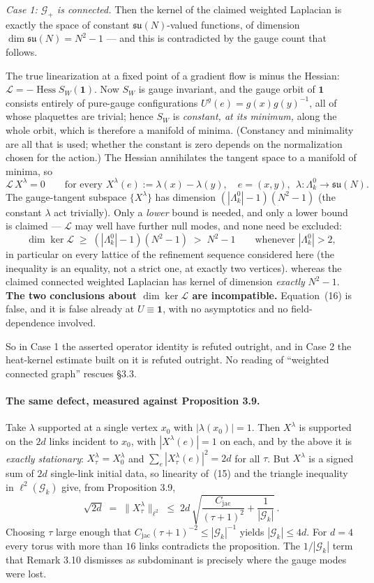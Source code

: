 \documentclass[11pt]{article}
\newcommand{\su}{\mathfrak{su}}
\begin{document}
\emph{Case 1: $\mathcal G_+$ is connected.} Then the kernel of the claimed weighted
Laplacian is exactly the space of constant $\su(N)$-valued functions, of dimension
$\dim\su(N)=N^2-1$ --- and this is contradicted by the gauge count that follows.

The true linearization at a fixed point of a gradient flow is minus the Hessian:
$\mathcal L=-\operatorname{Hess}S_W(\mathbf 1)$. Now $S_W$ is gauge invariant, and the
gauge orbit of $\mathbf 1$ consists entirely of pure-gauge configurations
$U^g(e)=g(x)g(y)^{-1}$, all of whose plaquettes are trivial; hence $S_W$ is
\emph{constant, at its minimum,} along the whole orbit, which is therefore a manifold
of minima. (Constancy and minimality are all that is used; whether the constant is
zero depends on the normalization chosen for the action.) The Hessian annihilates the
tangent space to a manifold of minima, so
\[
\mathcal L\,X^\lambda=0
\qquad\text{for every }
X^\lambda(e):=\lambda(x)-\lambda(y),\quad e=(x,y),\ \ \lambda:\Lambda^0_k\to\su(N).
\]
The gauge-tangent subspace $\{X^\lambda\}$ has dimension $(|\Lambda^0_k|-1)(N^2-1)$
(the constant $\lambda$ act trivially). Only a \emph{lower} bound is needed, and only
a lower bound is claimed --- $\mathcal L$ may well have further null modes, and none
need be excluded:
\[
\dim\ker\mathcal L\;\ge\;(|\Lambda^0_k|-1)(N^2-1)\;>\;N^2-1
\qquad\text{whenever }|\Lambda^0_k|>2,
\]
in particular on every lattice of the refinement sequence considered here (the
inequality is an equality, not a strict one, at exactly two vertices).
whereas the claimed connected weighted Laplacian has kernel of dimension
\emph{exactly} $N^2-1$. \textbf{The two conclusions about $\dim\ker\mathcal L$ are
incompatible.} Equation~(16) is false, and it is false already at $U\equiv\mathbf 1$,
with no asymptotics and no field-dependence involved.

So in Case 1 the asserted operator identity is refuted outright, and in Case 2 the
heat-kernel estimate built on it is refuted outright. No reading of ``weighted
connected graph'' rescues \S3.3.

\paragraph{The same defect, measured against Proposition 3.9.}
Take $\lambda$ supported at a single vertex $x_0$ with $|\lambda(x_0)|=1$. Then $X^\lambda$
is supported on the $2d$ links incident to $x_0$, with $|X^\lambda(e)|=1$ on each, and by
the above it is \emph{exactly stationary}: $X^\lambda_\tau=X^\lambda_0$ and
$\sum_e|X^\lambda_\tau(e)|^2=2d$ for all $\tau$. But $X^\lambda$ is a signed sum of $2d$
single-link initial data, so linearity of~(15) and the triangle inequality in
$\ell^2(\mathcal G_k)$ give, from Proposition 3.9,
\[
\sqrt{2d}\;=\;\bigl\|X^\lambda_\tau\bigr\|_{\ell^2}
\;\le\; 2d\,\sqrt{\frac{C_{\mathrm{jac}}}{(\tau+1)^2}+\frac{1}{|\mathcal G_k|}}\,.
\]
Choosing $\tau$ large enough that $C_{\mathrm{jac}}(\tau+1)^{-2}\le|\mathcal G_k|^{-1}$
yields $|\mathcal G_k|\le 4d$. For $d=4$ every torus with more than $16$ links
contradicts the proposition. The $1/|\mathcal G_k|$ term that Remark 3.10 dismisses as
subdominant is precisely where the gauge modes were lost.
\end{document}
